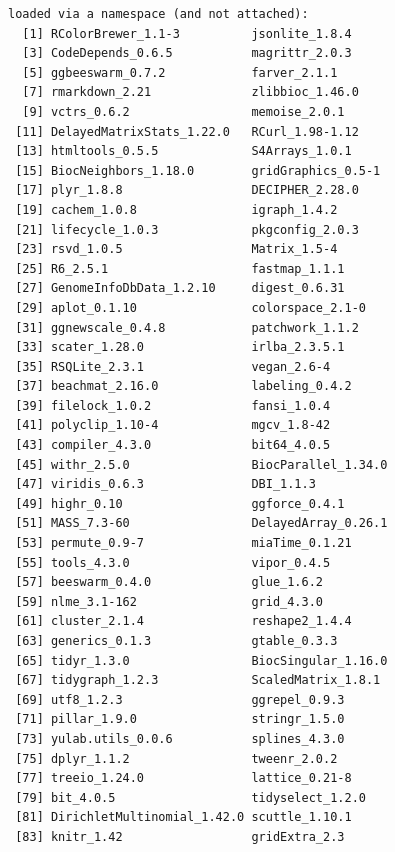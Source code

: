 \documentclass[
]{book}
\begin{document}
\begin{verbatim}
loaded via a namespace (and not attached):
  [1] RColorBrewer_1.1-3          jsonlite_1.8.4             
  [3] CodeDepends_0.6.5           magrittr_2.0.3             
  [5] ggbeeswarm_0.7.2            farver_2.1.1               
  [7] rmarkdown_2.21              zlibbioc_1.46.0            
  [9] vctrs_0.6.2                 memoise_2.0.1              
 [11] DelayedMatrixStats_1.22.0   RCurl_1.98-1.12            
 [13] htmltools_0.5.5             S4Arrays_1.0.1             
 [15] BiocNeighbors_1.18.0        gridGraphics_0.5-1         
 [17] plyr_1.8.8                  DECIPHER_2.28.0            
 [19] cachem_1.0.8                igraph_1.4.2               
 [21] lifecycle_1.0.3             pkgconfig_2.0.3            
 [23] rsvd_1.0.5                  Matrix_1.5-4               
 [25] R6_2.5.1                    fastmap_1.1.1              
 [27] GenomeInfoDbData_1.2.10     digest_0.6.31              
 [29] aplot_0.1.10                colorspace_2.1-0           
 [31] ggnewscale_0.4.8            patchwork_1.1.2            
 [33] scater_1.28.0               irlba_2.3.5.1              
 [35] RSQLite_2.3.1               vegan_2.6-4                
 [37] beachmat_2.16.0             labeling_0.4.2             
 [39] filelock_1.0.2              fansi_1.0.4                
 [41] polyclip_1.10-4             mgcv_1.8-42                
 [43] compiler_4.3.0              bit64_4.0.5                
 [45] withr_2.5.0                 BiocParallel_1.34.0        
 [47] viridis_0.6.3               DBI_1.1.3                  
 [49] highr_0.10                  ggforce_0.4.1              
 [51] MASS_7.3-60                 DelayedArray_0.26.1        
 [53] permute_0.9-7               miaTime_0.1.21             
 [55] tools_4.3.0                 vipor_0.4.5                
 [57] beeswarm_0.4.0              glue_1.6.2                 
 [59] nlme_3.1-162                grid_4.3.0                 
 [61] cluster_2.1.4               reshape2_1.4.4             
 [63] generics_0.1.3              gtable_0.3.3               
 [65] tidyr_1.3.0                 BiocSingular_1.16.0        
 [67] tidygraph_1.2.3             ScaledMatrix_1.8.1         
 [69] utf8_1.2.3                  ggrepel_0.9.3              
 [71] pillar_1.9.0                stringr_1.5.0              
 [73] yulab.utils_0.0.6           splines_4.3.0              
 [75] dplyr_1.1.2                 tweenr_2.0.2               
 [77] treeio_1.24.0               lattice_0.21-8             
 [79] bit_4.0.5                   tidyselect_1.2.0           
 [81] DirichletMultinomial_1.42.0 scuttle_1.10.1             
 [83] knitr_1.42                  gridExtra_2.3              

\end{verbatim}
\end{document}
